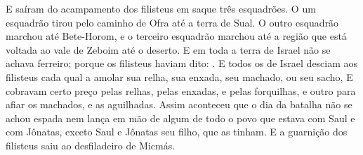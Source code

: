 {  E saíram do acampamento dos filisteus em saque três esquadrões. O um esquadrão tirou pelo caminho de Ofra até a terra de Sual.
  O outro esquadrão marchou até Bete-Horom, e o terceiro esquadrão marchou até a região que está voltada ao vale de Zeboim até o deserto.
  E em toda a terra de Israel não se achava ferreiro; porque os filisteus haviam dito: .
  E todos os de Israel desciam aos filisteus cada qual a amolar sua relha, sua enxada, seu machado, ou seu sacho,
  E cobravam certo preço pelas relhas, pelas enxadas, e pelas forquilhas, e outro para afiar os machados, e as aguilhadas.
  Assim aconteceu que o dia da batalha não se achou espada nem lança em mão de algum de todo o povo que estava com Saul e com Jônatas, exceto Saul e Jônatas seu filho, que as tinham.
  E a guarnição dos filisteus saiu ao desfiladeiro de Micmás.
\par }

